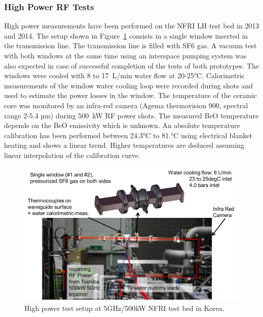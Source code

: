\subsubsection{High Power RF Tests}
High power measurements have been performed on the NFRI LH test bed in 2013 and 2014. The setup shown in Figure~\ref{fig:iterwindowsrftests} consists in a single window inserted in the transmission line. The transmission line is filled with SF6 gas. A vacuum test with both windows at the same time using an interspace pumping system was also expected in case of successful completion of the tests of both prototypes. The windows were cooled with 8 to 17~\si{L/min} water flow at 20-25$\si{\degreeCelsius}$. Calorimetric measurements of the window water cooling loop were recorded during shots and used to estimate the power losses in the window. The temperature of the ceramic core was monitored by an infra-red camera (Agema thermovision 900, spectral range 2-5.4 \si{µm}) during 500~kW RF power shots. The measured BeO temperature depends on the BeO emissivity which is unknown. An absolute temperature calibration has been performed between 24.3$\si{\degreeCelsius}$ to 81.$\si{\degreeCelsius}$ using electrical blanket heating and shows a linear trend. Higher temperatures are deduced assuming linear interpolation of the calibration curve. 

\begin{figure}
	\centering
	\includegraphics[width=1.0\linewidth]{figures/chap3/ITER_window/ITER_windows_RF_tests}
	\caption{High power test setup at 5GHz/500kW NFRI test bed in Korea.}
	\label{fig:iterwindowsrftests}
\end{figure}

